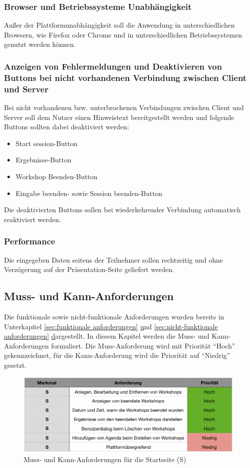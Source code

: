 \subsubsection*{Browser und Betriebssysteme Unabhängigkeit}
Außer der Plattformunabhängigkeit soll die Anwendung in unterschiedlichen Browsern, wie Firefox oder Chrome und in unterschiedlichen Betriebssystemen genutzt werden können.

\subsubsection*{Anzeigen von Fehlermeldungen und Deaktivieren von Buttons bei nicht vorhandenen Verbindung zwischen Client und Server}
Bei nicht vorhandenen bzw. unterbrochenen Verbindungen zwischen Client und Server soll dem Nutzer einen Hinweistext bereitgestellt werden und folgende Buttons sollten dabei deaktiviert werden:
\begin{itemize}
\item Start session-Button
\item Ergebnisse-Button
\item Workshop Beenden-Button
\item Eingabe beenden- sowie Session beenden-Button
\end{itemize}
Die deaktivierten Buttons sollen bei wiederkehrender Verbindung automatisch reaktiviert werden.

\subsubsection*{Performance}
Die eingegeben Daten seitens der Teilnehmer sollen rechtzeitig und ohne Verzögerung auf der Präsentation-Seite geliefert werden.

\subsection{Muss- und Kann-Anforderungen}
Die funktionale sowie nicht-funktionale Anforderungen wurden bereits in Unterkapitel \ref{sec:funktionale anforderungen} \hyperref[sec:funktionale anforderungen] und \ref{sec:nicht-funktionale anforderungen} \hyperref[sec:nicht-funktionale anforderungen] dargestellt. In diesem Kapitel werden die Muss- und Kann-Anforderungen formuliert. Die Muss-Anforderung wird mit Priorität “Hoch” gekennzeichnet, für die Kann-Anforderung wird die Priorität auf “Niedrig” gesetzt.\\

\begin{figure}[H]
  \centering  
  \includegraphics[scale=0.6]{img/Startseite.png}
  \caption{Muss- und Kann-Anforderungen für die Startseite (S)}
  \label{fig:startseite}
\end{figure}	

